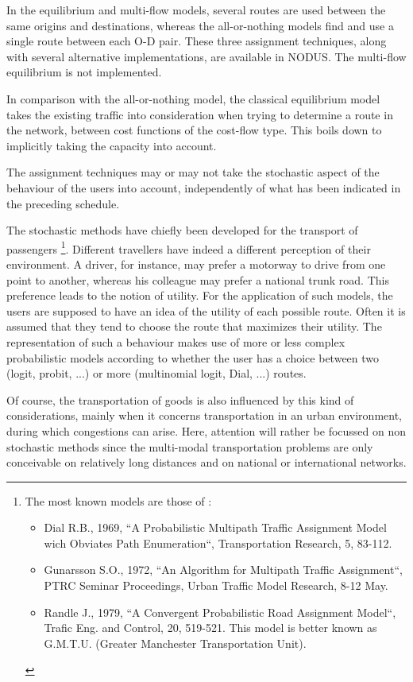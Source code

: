 In the equilibrium and multi-flow models, several routes are used between the
same origins and destinations, whereas the all-or-nothing models
 find and use a single route between each O-D pair. These three assignment
 techniques, along with several alternative implementations, are available in
 NODUS. The multi-flow equilibrium is not implemented.

In comparison with the all-or-nothing model, the classical equilibrium model
takes the existing traffic into consideration when trying to determine a route
in the network, between cost functions of the cost-flow type. This boils
down to implicitly taking the capacity into account.

The assignment techniques may or may not take the stochastic aspect of the
behaviour of the users into account, independently of what has been indicated in
the preceding schedule.

The stochastic methods have chiefly been developed for the transport of passengers
\footnote{The most known models are those of :
\begin{itemize}
\item Dial R.B., 1969, ``A Probabilistic Multipath Traffic Assignment
Model wich Obviates Path Enumeration``, Transportation Research, 5,
83-112.
\item Gunarsson S.O., 1972, ``An Algorithm for Multipath Traffic Assignment``,
PTRC Seminar Proceedings, Urban Traffic Model Research, 8-12 May.
\item Randle J., 1979, ``A Convergent Probabilistic Road Assignment
Model``, Trafic Eng. and Control, 20, 519-521.  This model is better known  as
G.M.T.U. (Greater Manchester Transportation Unit).
\end{itemize}}.
Different travellers have indeed a different perception of their environment. A
driver, for instance, may prefer a motorway to drive from one point to another,
whereas his colleague may prefer a national trunk road.  This preference leads to the notion of utility.  For the application of such models, the
users are supposed to have an idea of the utility of each possible route.
Often it is assumed that they tend to choose the route that maximizes their utility.
The representation of such a behaviour makes use of more or less complex
probabilistic models according to whether the user has a choice between two
(logit, probit, ...) or more (multinomial logit, Dial, ...) routes.

Of course, the transportation of goods is also influenced by this kind of
considerations, mainly when it concerns transportation in an urban environment,
during which congestions can arise.  Here, attention will rather be focussed on
non stochastic methods since the multi-modal transportation problems are only
conceivable on relatively long distances and on national or international
networks.


